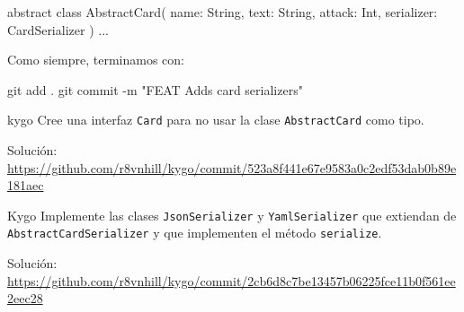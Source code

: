   \begin{kotlin}
    abstract class AbstractCard(
      name: String, text: String, attack: Int,
      serializer: CardSerializer
    ) {...}
  \end{kotlin}

  Como siempre, terminamos con:

  \begin{powershell}
    git add .
    git commit -m "FEAT Adds card serializers"
  \end{powershell}

  \begin{ejercicio}{kygo}
    Cree una interfaz \texttt{Card} para no usar la clase \texttt{AbstractCard} como tipo.

    {
      \footnotesize Solución: 
      \url{https://github.com/r8vnhill/kygo/commit/523a8f441e67e9583a0c2edf53dab0b89e181aec}
    }
  \end{ejercicio}
    
  \begin{ejercicio}{Kygo}
    Implemente las clases \texttt{JsonSerializer} y \texttt{YamlSerializer} que extiendan de
    \texttt{AbstractCardSerializer} y que implementen el método \texttt{serialize}.

    {\footnotesize
      Solución:
      \url{https://github.com/r8vnhill/kygo/commit/2cb6d8c7be13457b06225fce11b0f561ee2eec28}
    }
  \end{ejercicio}


